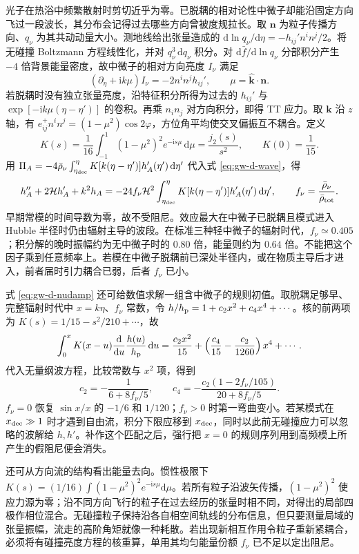 光子在热浴中频繁散射时剪切近乎为零。已脱耦的相对论性中微子却能沿固定方向飞过一段波长，其分布会记得过去哪些方向曾被度规拉长。取 $\bm n$ 为粒子传播方向、$q_\nu$ 为其共动动量大小。测地线给出张量造成的 $\mathrm d\ln q_\nu/\mathrm d\eta=-h_{ij}'n^in^j/2$。将无碰撞 Boltzmann 方程线性化，并对 $q_\nu^3\,\mathrm dq_\nu$ 积分。对 $\mathrm d\bar f/\mathrm d\ln q_\nu$ 分部积分产生 $-4$ 倍背景能量密度，故中微子的相对方向亮度 $I_\nu$ 满足
\[
 (\partial_\eta+\mathrm i k\mu)I_\nu=-2n^i n^j h_{ij}',\qquad
 \mu=\hat{\bm k}\cdot\bm n.
\]
若脱耦时没有独立张量亮度，沿特征积分所得为过去的 $h_{ij}'$ 与 $\exp[-\mathrm i k\mu(\eta-\eta')]$ 的卷积。再乘 $n_i n_j$ 对方向积分，即得 TT 应力。取 $\bm k$ 沿 $z$ 轴，有 $e^+_{ij}n^i n^j=(1-\mu^2)\cos2\varphi$，方位角平均使交叉偏振互不耦合。定义
\[
 K(s)=\frac{1}{16}\int_{-1}^{1}(1-\mu^2)^2e^{-\mathrm i s\mu}\,\mathrm d\mu
 =\frac{j_2(s)}{s^2},\qquad K(0)=\frac1{15}.
\]
用 $\Pi_A=-4\bar\rho_\nu\int_{\eta_{\rm dec}}^\eta K[k(\eta-\eta')]h_A'(\eta')\,\mathrm d\eta'$ 代入式 \eqref{eq:gw-d-wave}，得
\begin{equation}\label{eq:gw-d-nudamp}
 h_A''+2\mathcal H h_A'+k^2 h_A
 =-24 f_\nu \mathcal H^2\int_{\eta_{\rm dec}}^\eta
 K[k(\eta-\eta')]h_A'(\eta')\,\mathrm d\eta',
 \qquad f_\nu=\frac{\bar\rho_\nu}{\bar\rho_{\rm tot}} .
\end{equation}
早期常模的时间导数为零，故不受阻尼。效应最大在中微子已脱耦且模式进入 Hubble 半径时仍由辐射主导的波段。在标准三种轻中微子的辐射时代，$f_\nu\simeq0.405$；积分解的晚时振幅约为无中微子时的 $0.80$ 倍，能量则约为 $0.64$ 倍。不能把这个因子乘到任意频率上。若模在中微子脱耦前已深处半径内，或在物质主导后才进入，前者届时引力耦合已弱，后者 $f_\nu$ 已小。


式 \eqref{eq:gw-d-nudamp} 还可给数值求解一组含中微子的规则初值。取脱耦足够早、完整辐射时代中 $x=k\eta$、$f_\nu$ 常数，令 $h/h_{\rm p}=1+c_2x^2+c_4x^4+\cdots$。核的前两项为 $K(s)=1/15-s^2/210+\cdots$，故
\[
 \int_0^x K(x-u)\frac{\mathrm d}{\mathrm du}\frac{h(u)}{h_{\rm p}}\,\mathrm du
 =\frac{c_2x^2}{15}
   +\left(\frac{c_4}{15}-\frac{c_2}{1260}\right)x^4+\cdots .
\]
代入无量纲波方程，比较常数与 $x^2$ 项，得到
\[
 c_2=-\frac1{6+8f_\nu/5},\qquad
 c_4=-\frac{c_2(1-2f_\nu/105)}{20+8f_\nu/5}.
\]
$f_\nu=0$ 恢复 $\sin x/x$ 的 $-1/6$ 和 $1/120$；$f_\nu>0$ 时第一弯曲变小。若某模式在 $x_{\rm dec}\gg1$ 时才遇到自由流，积分下限应移到 $x_{\rm dec}$，同时以此前无碰撞应力可以忽略的波解给 $h,h'$。补作这个匹配之后，强行把 $x=0$ 的规则序列用到高频模上所产生的假阻尼便会消失。

还可从方向流的结构看出能量去向。惯性极限下 $K(s)=(1/16)\int(1-\mu^2)^2e^{-\mathrm is\mu}\mathrm d\mu$。若所有粒子沿波矢传播，$(1-\mu^2)^2$ 使应力源为零；沿不同方向飞行的粒子在过去经历的张量时相不同，对得出的局部四极作相位混合。无碰撞粒子保持沿各自相空间轨线的分布信息，但只要测量局域的张量振幅，流走的高阶角矩就像一种耗散。若出现新相互作用令粒子重新紧耦合，必须将有碰撞亮度方程的核重算，单用其均匀能量份额 $f_\nu$ 已不足以定出阻尼。
